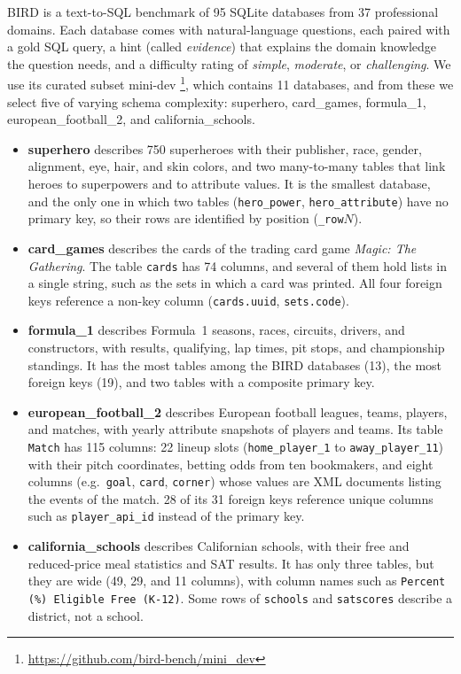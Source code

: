 BIRD \citep{li2023bird} is a text-to-SQL benchmark of 95 SQLite databases from 37 professional domains. Each database comes with natural-language questions, each paired with a gold SQL query, a hint (called \emph{evidence}) that explains the domain knowledge the question needs, and a difficulty rating of \emph{simple}, \emph{moderate}, or \emph{challenging}. We use its curated subset mini-dev \footnote{\url{https://github.com/bird-bench/mini_dev}}, which contains 11 databases, and from these we select five of varying schema complexity: superhero, card\_games, formula\_1, european\_football\_2, and california\_schools.
\begin{itemize}[leftmargin=*, itemsep=2pt]
  \item \textbf{superhero} describes 750 superheroes with their publisher, race, gender, alignment, eye, hair, and skin colors, and two many-to-many tables that link heroes to superpowers and to attribute values. It is the smallest database, and the only one in which two tables (\texttt{hero\_power}, \texttt{hero\_attribute}) have no primary key, so their rows are identified by position (\texttt{\_row}\(N\)).
  \item \textbf{card\_games} describes the cards of the trading card game \emph{Magic: The Gathering}. The table \texttt{cards} has 74 columns, and several of them hold lists in a single string, such as the sets in which a card was printed. All four foreign keys reference a non-key column (\texttt{cards.uuid}, \texttt{sets.code}).
  \item \textbf{formula\_1} describes Formula~1 seasons, races, circuits, drivers, and constructors, with results, qualifying, lap times, pit stops, and championship standings. It has the most tables among the BIRD databases (13), the most foreign keys (19), and two tables with a composite primary key.
  \item \textbf{european\_football\_2} describes European football leagues, teams, players, and matches, with yearly attribute snapshots of players and teams. Its table \texttt{Match} has 115 columns: 22 lineup slots (\texttt{home\_player\_1} to \texttt{away\_player\_11}) with their pitch coordinates, betting odds from ten bookmakers, and eight columns (e.g.\ \texttt{goal}, \texttt{card}, \texttt{corner}) whose values are XML documents listing the events of the match. 28 of its 31 foreign keys reference unique columns such as \texttt{player\_api\_id} instead of the primary key.
  \item \textbf{california\_schools} describes Californian schools, with their free and reduced-price meal statistics and SAT results. It has only three tables, but they are wide (49, 29, and 11 columns), with column names such as \texttt{Percent (\%) Eligible Free (K-12)}. Some rows of \texttt{schools} and \texttt{satscores} describe a district, not a school.
\end{itemize}

